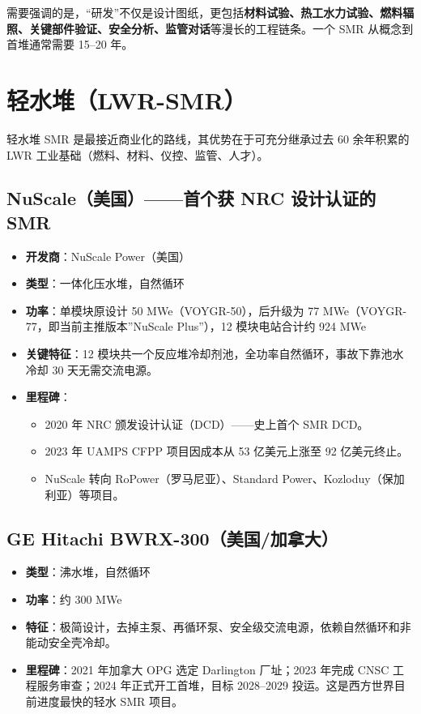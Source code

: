 \documentclass[
  UTF8,
  scheme=plain,
  fontsize=10pt,
  openany
]{ctexbook}
\begin{document}
需要强调的是，``研发''不仅是设计图纸，更包括\textbf{材料试验、热工水力试验、燃料辐照、关键部件验证、安全分析、监管对话}等漫长的工程链条。一个
SMR 从概念到首堆通常需要 15--20 年。

\section{轻水堆（LWR-SMR）}\label{ux8f7bux6c34ux5806lwr-smr}

轻水堆 SMR 是最接近商业化的路线，其优势在于可充分继承过去 60 余年积累的
LWR 工业基础（燃料、材料、仪控、监管、人才）。

\subsection{NuScale（美国）------首个获 NRC 设计认证的
SMR}\label{nuscaleux7f8eux56fdux9996ux4e2aux83b7-nrc-ux8bbeux8ba1ux8ba4ux8bc1ux7684-smr}

\begin{itemize}
\tightlist
\item
  \textbf{开发商}：NuScale Power（美国）
\item
  \textbf{类型}：一体化压水堆，自然循环
\item
  \textbf{功率}：单模块原设计 50 MWe（VOYGR-50），后升级为 77
  MWe（VOYGR-77，即当前主推版本''NuScale Plus''），12 模块电站合计约 924
  MWe
\item
  \textbf{关键特征}：12
  模块共一个反应堆冷却剂池，全功率自然循环，事故下靠池水冷却 30
  天无需交流电源。
\item
  \textbf{里程碑}：

  \begin{itemize}
  \tightlist
  \item
    2020 年 NRC 颁发设计认证（DCD）------史上首个 SMR DCD。
  \item
    2023 年 UAMPS CFPP 项目因成本从 53 亿美元上涨至 92 亿美元终止。
  \item
    NuScale 转向 RoPower（罗马尼亚）、Standard
    Power、Kozloduy（保加利亚）等项目。
  \end{itemize}
\end{itemize}

\subsection{GE Hitachi
BWRX-300（美国/加拿大）}\label{ge-hitachi-bwrx-300ux7f8eux56fdux52a0ux62ffux5927}

\begin{itemize}
\tightlist
\item
  \textbf{类型}：沸水堆，自然循环
\item
  \textbf{功率}：约 300 MWe
\item
  \textbf{特征}：极简设计，去掉主泵、再循环泵、安全级交流电源，依赖自然循环和非能动安全壳冷却。
\item
  \textbf{里程碑}：2021 年加拿大 OPG 选定 Darlington 厂址；2023 年完成
  CNSC 工程服务审查；2024 年正式开工首堆，目标 2028--2029
  投运。这是西方世界目前进度最快的轻水 SMR 项目。
\end{itemize}
\end{document}
